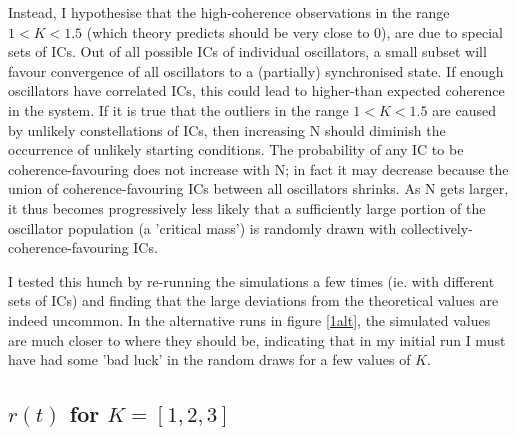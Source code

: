 \documentclass[11pt,a4paper]{article}
\begin{document}
Instead, I hypothesise that the high-coherence observations in the range $1<K<1.5$ (which theory predicts should be very close to 0), are due to special sets of ICs. 
Out of all possible ICs of individual oscillators, a small subset will favour convergence of all oscillators to a (partially) synchronised state. 
If enough oscillators have correlated ICs, this could lead to higher-than expected coherence in the system.
If it is true that the outliers in the range $1<K<1.5$ are caused by unlikely constellations of ICs, then increasing N should diminish the occurrence of unlikely starting conditions. 
The probability of any IC to be coherence-favouring does not increase with N; in fact it may decrease because the union of coherence-favouring ICs between all oscillators shrinks.
As N gets larger, it thus becomes progressively less likely that a sufficiently large portion of the oscillator population (a 'critical mass') is randomly drawn with collectively-coherence-favouring ICs.


I tested this hunch by re-running the simulations a few times (ie. with different sets of ICs) and finding that the large deviations from the theoretical values are indeed uncommon. 
In the alternative runs in figure \ref{1alt}, the simulated values are much closer to where they should be, indicating that in my initial run I must have had some 'bad luck' in the random draws for a few values of $K$.








\subsection{$r(t)$ for $K = [1, 2,3]$} \label{r(t)}
\end{document}
